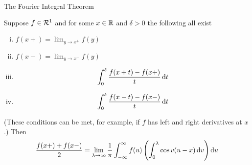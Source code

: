 \begin{section}{The Fourier Integral Theorem}
\begin{thrm}
\label{thrm:FIT1}
	Suppose $f \in \mathcal{R}^1$ and for some ${x} \in \mathbb{R}$ and $\delta
	> 0$ the following all exist
		\begin{enumerate}[i)]
			\item
				$f(x+)=\lim_{y \rightarrow x^+}f(y)$
			\item
				$f(x-)=\lim_{y \rightarrow x^-}f(y)$
			\item
				\begin{displaymath}
					\int_{0}^{\delta}{\frac{f(x+t)-f(x+)}{t}}\, \mathrm{d}{t}
				\end{displaymath}
			\item
				\begin{displaymath}
					\int_{0}^{\delta}{\frac{f(x-t)-f(x-)}{t}}\, \mathrm{d}{t}
				\end{displaymath}
		\end{enumerate}
	(These conditions can be met, for example, if $f$ has left and
	right derivatives at $x$.) Then
		\begin{displaymath}
			\frac{f(x+)+f(x-)}{2}=\lim_{\lambda \rightarrow \infty}
				\frac{1}{\pi}\int_{-\infty}^{\infty}{f(u)\left(
				\int_{0}^{\lambda}{\cos v(u-x)}\, \mathrm{d}{v}\right)}\, \mathrm{d}{u}
		\end{displaymath}
\end{thrm}


\end{section}
